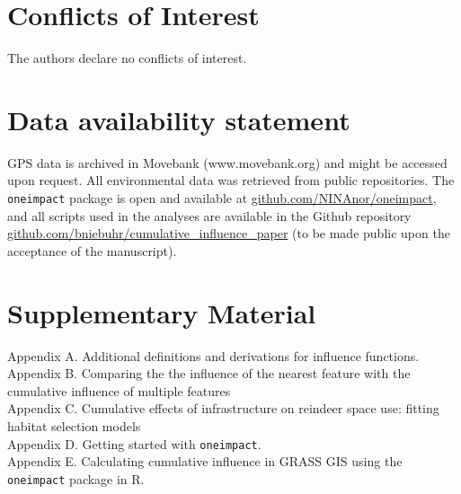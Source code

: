 \documentclass[titlepage]{article}
\begin{document}
\section*{Conflicts of Interest}

The authors declare no conflicts of interest.

\section*{Data availability statement}

GPS data is archived in Movebank (www.movebank.org) and might be accessed upon request. All environmental data was retrieved from public repositories. The \verb|oneimpact| package is open and available at \url{github.com/NINAnor/oneimpact}, and all scripts used in the analyses are available in the Github repository \url{github.com/bniebuhr/cumulative_influence_paper} (to be made public upon the acceptance of the manuscript).

\section*{Supplementary Material}

Appendix A. Additional definitions and derivations for influence functions. \\
Appendix B. Comparing the the influence of the nearest feature with the cumulative influence of multiple features \\
Appendix C. Cumulative effects of infrastructure on reindeer space use: fitting habitat selection models \\
Appendix D. Getting started with \verb|oneimpact|. \\
Appendix E. Calculating cumulative influence in GRASS GIS using the \verb|oneimpact| package in R.



\end{document}
